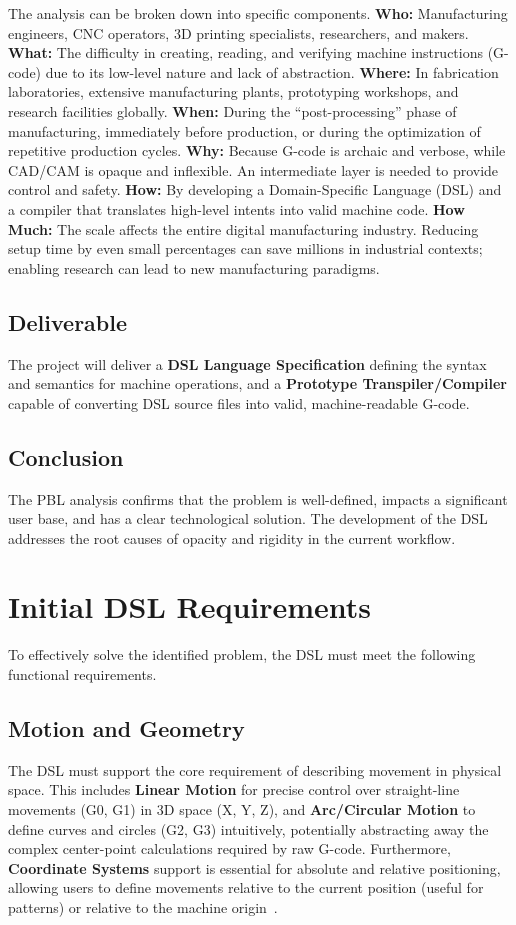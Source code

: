 The analysis can be broken down into specific components. \textbf{Who:} Manufacturing engineers, CNC operators, 3D printing specialists, researchers, and makers. \textbf{What:} The difficulty in creating, reading, and verifying machine instructions (G-code) due to its low-level nature and lack of abstraction. \textbf{Where:} In fabrication laboratories, extensive manufacturing plants, prototyping workshops, and research facilities globally. \textbf{When:} During the ``post-processing'' phase of manufacturing, immediately before production, or during the optimization of repetitive production cycles. \textbf{Why:} Because G-code is archaic and verbose, while CAD/CAM is opaque and inflexible. An intermediate layer is needed to provide control and safety. \textbf{How:} By developing a Domain-Specific Language (DSL) and a compiler that translates high-level intents into valid machine code. \textbf{How Much:} The scale affects the entire digital manufacturing industry. Reducing setup time by even small percentages can save millions in industrial contexts; enabling research can lead to new manufacturing paradigms.

\subsection{Deliverable}
The project will deliver a \textbf{DSL Language Specification} defining the syntax and semantics for machine operations, and a \textbf{Prototype Transpiler/Compiler} capable of converting DSL source files into valid, machine-readable G-code.

\subsection{Conclusion}
The PBL analysis confirms that the problem is well-defined, impacts a significant user base, and has a clear technological solution. The development of the DSL addresses the root causes of opacity and rigidity in the current workflow.

\section{Initial DSL Requirements}

To effectively solve the identified problem, the DSL must meet the following functional requirements.

\subsection{Motion and Geometry}
The DSL must support the core requirement of describing movement in physical space. This includes \textbf{Linear Motion} for precise control over straight-line movements (G0, G1) in 3D space (X, Y, Z), and \textbf{Arc/Circular Motion} to define curves and circles (G2, G3) intuitively, potentially abstracting away the complex center-point calculations required by raw G-code. Furthermore, \textbf{Coordinate Systems} support is essential for absolute and relative positioning, allowing users to define movements relative to the current position (useful for patterns) or relative to the machine origin~\cite{propst_time_2025}.

